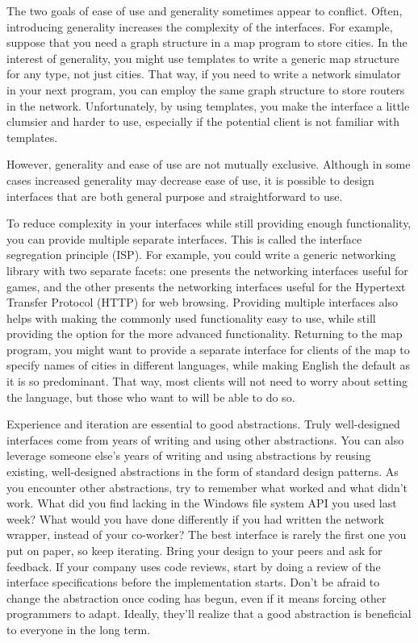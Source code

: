 The two goals of ease of use and generality sometimes appear to conflict. Often, introducing generality increases the complexity of the interfaces. For example, suppose that you need a graph structure in a map program to store cities. In the interest of generality, you might use templates to write a generic map structure for any type, not just cities. That way, if you need to write a network simulator in your next program, you can employ the same graph structure to store routers in the network. Unfortunately, by using templates, you make the interface a little clumsier and harder to use, especially if the potential client is not familiar with templates.

However, generality and ease of use are not mutually exclusive. Although in some cases increased generality may decrease ease of use, it is possible to design interfaces that are both general purpose and straightforward to use.

To reduce complexity in your interfaces while still providing enough functionality, you can provide multiple separate interfaces. This is called the interface segregation principle (ISP). For example, you could write a generic networking library with two separate facets: one presents the networking interfaces useful for games, and the other presents the networking interfaces useful for the Hypertext Transfer Protocol (HTTP) for web browsing. Providing multiple interfaces also helps with making the commonly used functionality easy to use, while still providing the option for the more advanced functionality. Returning to the map program, you might want to provide a separate interface for clients of the map to specify names of cities in different languages, while making English the default as it is so predominant. That way, most clients will not need to worry about setting the language, but those who want to will be able to do so.


Experience and iteration are essential to good abstractions. Truly well-designed interfaces come from years of writing and using other abstractions. You can also leverage someone else’s years of writing and using abstractions by reusing existing, well-designed abstractions in the form of standard design patterns. As you encounter other abstractions, try to remember what worked and what didn’t work. What did you find lacking in the Windows file system API you used last week? What would you have done differently if you had written the network wrapper, instead of your co-worker? The best interface is rarely the first one you put on paper, so keep iterating. Bring your design to your peers and ask for feedback. If your company uses code reviews, start by doing a review of the interface specifications before the implementation starts. Don’t be afraid to change the abstraction once coding has begun, even if it means forcing other programmers to adapt. Ideally, they’ll realize that a good abstraction is beneficial to everyone in the long term.


